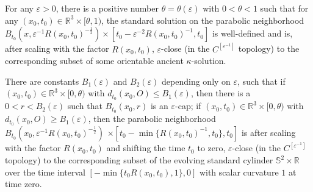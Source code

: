 \begin{proposition}
  \label{prop:cz-standard-solution-late-time-ancient-model}

For any $\varepsilon>0$, there is a positive number
$\theta=\theta(\varepsilon)$ with $0<\theta<1$ such that for any
$(x_0,t_0)\in \mathbb{R}^3\times [\theta,1)$, the standard
solution on the parabolic neighborhood
$B_{t_0}(x,\varepsilon^{-1}R(x_0,t_0)^{-\frac{1}{2}}) \times
[t_0-\varepsilon^{-2}R(x_0,t_0)^{-1},t_0]$ is well-defined and is,
after scaling with the factor $R(x_0,t_0)$, $\varepsilon$-close
(in the $C^{[\varepsilon^{-1}]}$ topology) to the corresponding
subset of some orientable ancient $\kappa$-solution.
\end{proposition}
\begin{proposition}
  \label{prop:cz-standard-solution-early-time-cap-neck}

There are constants $B_1(\varepsilon)$ and $B_2(\varepsilon)$
depending only on $\varepsilon$, such that if $(x_0,t_0)\in
\mathbb{R}^3\times [0,\theta)$ with $d_{t_0}(x_0,O)\leq
B_{1}(\varepsilon)$, then there is a $0<r<B_2(\varepsilon)$ such
that $B_{t_0}(x_0,r)$ is an $\varepsilon$-cap; if $(x_0,t_0)\in
\mathbb{R}^3\times [0,\theta)$ with $d_{t_0}(x_0,O)\geq
B_1(\varepsilon)$, then the parabolic neighborhood
$B_{t_0}(x_0,\varepsilon^{-1}R(x_0,t_0)^{-\frac{1}{2}})$ $\times
[t_0-\min \{R(x_0,t_0)^{-1},t_0\},t_0]$ is after scaling with the
factor $R(x_0,t_0)$ and shifting the time $t_0$ to zero,
$\varepsilon$-close (in the $C^{[\varepsilon^{-1}]}$ topology) to
the corresponding subset of the evolving standard cylinder
$\mathbb{S}^2 \times \mathbb{R}$ over the time interval $[-\min
\{t_0R(x_0,t_0),1\},0]$ with scalar curvature $1$ at time zero.
\end{proposition}
